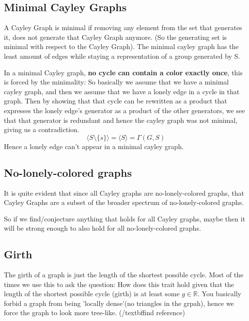 \documentclass[a4paper,10pt]{article}
\numberwithin{equation}{section}
\theoremstyle{definition}
\begin{document}
    \subsection{Minimal Cayley Graphs}
       A Cayley Graph is minimal if removing any element from the set that generates it, does not generate that Cayley Graph anymore. (So the generating set is minimal with respect to the Cayley Graph).
       The minimal cayley graph has the least amount of edges while staying a representation of a group generated by S.

       In a minimal Cayley graph, \textbf{no cycle can contain a color exactly once}, this is forced by the minimality:
       So basically we assume that we have a minimal cayley graph, and then we assume that we have a lonely edge in a cycle in that graph. 
       Then by showing that that cycle can be rewritten as a product that expresses the lonely edge's generator as a product of the other generators, 
       we see that that generator is redundant and hence the cayley graph was not minimal, giving us a contradiction.
       \[\langle S \setminus \{s\}\rangle = \langle S\rangle = \Gamma(G, S)\]
       Hence a lonely edge can't appear in a minimal cayley graph.\cite{Babai1978}

    \subsection{No-lonely-colored graphs}
        It is quite evident that since all Cayley graphs are no-lonely-colored graphs, that Cayley Graphs are a subset of the broader spectrum of no-lonely-colored graphs.
        So if we find/conjecture anything that holds for all Cayley graphs, maybe then it will be strong enough to also hold for all no-lonely-colored graphs.
    \subsection{Girth}
        The girth of a graph is just the length of the shortest possible cycle. Most of the times we use this to ask the question: How does this trait hold given that the length of the shortest possible cycle (girth) is at least some \(g\in\mathbb{R}\).
        You basically forbid a graph from being 'locally dense'(no triangles in the grpah), hence we force the graph to look more tree-like. (/textbf{find reference})
\end{document}
